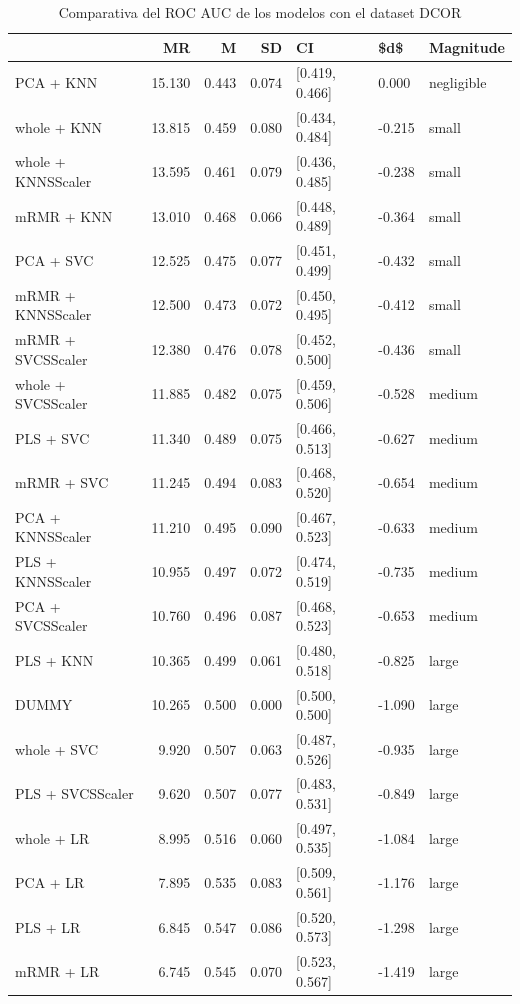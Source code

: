 \documentclass[a4paper,oneside,11pt,leqno]{article}
\begin{document}
	\begin{table}[h]
		\centering
		\begin{tabular}{lrrrlll}
			\toprule
			{} &     MR &     M &    SD &              CI &    \$d\$ &   Magnitude \\
			\midrule
			PCA + KNN          & 15.130 & 0.443 & 0.074 &  [0.419, 0.466] &  0.000 &  negligible \\
			whole + KNN        & 13.815 & 0.459 & 0.080 &  [0.434, 0.484] & -0.215 &       small \\
			whole + KNNSScaler & 13.595 & 0.461 & 0.079 &  [0.436, 0.485] & -0.238 &       small \\
			mRMR + KNN         & 13.010 & 0.468 & 0.066 &  [0.448, 0.489] & -0.364 &       small \\
			PCA + SVC          & 12.525 & 0.475 & 0.077 &  [0.451, 0.499] & -0.432 &       small \\
			mRMR + KNNSScaler  & 12.500 & 0.473 & 0.072 &  [0.450, 0.495] & -0.412 &       small \\
			mRMR + SVCSScaler  & 12.380 & 0.476 & 0.078 &  [0.452, 0.500] & -0.436 &       small \\
			whole + SVCSScaler & 11.885 & 0.482 & 0.075 &  [0.459, 0.506] & -0.528 &      medium \\
			PLS + SVC          & 11.340 & 0.489 & 0.075 &  [0.466, 0.513] & -0.627 &      medium \\
			mRMR + SVC         & 11.245 & 0.494 & 0.083 &  [0.468, 0.520] & -0.654 &      medium \\
			PCA + KNNSScaler   & 11.210 & 0.495 & 0.090 &  [0.467, 0.523] & -0.633 &      medium \\
			PLS + KNNSScaler   & 10.955 & 0.497 & 0.072 &  [0.474, 0.519] & -0.735 &      medium \\
			PCA + SVCSScaler   & 10.760 & 0.496 & 0.087 &  [0.468, 0.523] & -0.653 &      medium \\
			PLS + KNN          & 10.365 & 0.499 & 0.061 &  [0.480, 0.518] & -0.825 &       large \\
			DUMMY              & 10.265 & 0.500 & 0.000 &  [0.500, 0.500] & -1.090 &       large \\
			whole + SVC        &  9.920 & 0.507 & 0.063 &  [0.487, 0.526] & -0.935 &       large \\
			PLS + SVCSScaler   &  9.620 & 0.507 & 0.077 &  [0.483, 0.531] & -0.849 &       large \\
			whole + LR         &  8.995 & 0.516 & 0.060 &  [0.497, 0.535] & -1.084 &       large \\
			PCA + LR           &  7.895 & 0.535 & 0.083 &  [0.509, 0.561] & -1.176 &       large \\
			PLS + LR           &  6.845 & 0.547 & 0.086 &  [0.520, 0.573] & -1.298 &       large \\
			mRMR + LR          &  6.745 & 0.545 & 0.070 &  [0.523, 0.567] & -1.419 &       large \\
			\bottomrule
		\end{tabular}
		\caption{Comparativa del ROC AUC de los modelos con el dataset DCOR}
		\label{tab:stat_results_dcor}
	\end{table}
	
\end{document}
